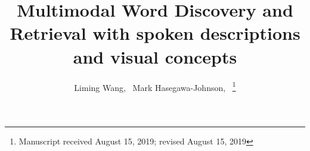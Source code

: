 \documentclass[journal]{IEEEtran}
\begin{document}
%
\title{Multimodal Word Discovery and Retrieval with spoken descriptions and visual concepts}
%
%
%

\author{Liming Wang,~
        Mark Hasegawa-Johnson,~
\thanks{Manuscript received August 15, 2019; revised August 15, 2019}}

% 
%
\end{document}
